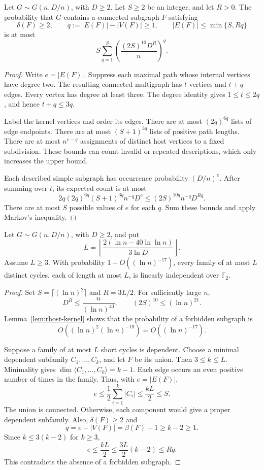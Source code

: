 \begin{lemma}
\label{lem:rhost-kernel}
Let $G\sim G(n,D/n)$, with $D\ge2$.
Let $S\ge2$ be an integer, and let $R>0$.
The probability that $G$ contains a connected subgraph $F$ satisfying
\[
 \delta(F)\ge2,\qquad
 q:=|E(F)|-|V(F)|\ge1,\qquad
 |E(F)|\le\min\{S,Rq\}
\]
is at most
\[
 S\sum_{q=1}^{S}
 \left(\frac{(2S)^{10}D^R}{n}\right)^q.
\]
\end{lemma}

\begin{proof}
Write $e=|E(F)|$.
Suppress each maximal path whose internal vertices have degree two.
The resulting connected multigraph has $t$ vertices and $t+q$ edges.
Every vertex has degree at least three.
The degree identity gives $1\le t\le2q$, and hence $t+q\le3q$.

Label the kernel vertices and order its edges.
There are at most $(2q)^{6q}$ lists of edge endpoints.
There are at most $(S+1)^{3q}$ lists of positive path lengths.
There are at most $n^{e-q}$ assignments of distinct host vertices to a fixed subdivision.
These bounds can count invalid or repeated descriptions, which only increases the upper bound.

Each described simple subgraph has occurrence probability $(D/n)^e$.
After summing over $t$, its expected count is at most
\[
 2q(2q)^{6q}(S+1)^{3q}n^{-q}D^e
 \le (2S)^{10q}n^{-q}D^{Rq}.
\]
There are at most $S$ possible values of $e$ for each $q$.
Sum these bounds and apply Markov's inequality.
\end{proof}

\begin{lemma}
\label{lem:rhost-independence}
Let $G\sim G(n,D/n)$, with $D\ge2$, and put
\[
 L=\left\lfloor
 \frac{2(\ln n-40\ln\ln n)}{3\ln D}
 \right\rfloor.
\]
Assume $L\ge3$.
With probability $1-O((\ln n)^{-17})$, every family of at most $L$ distinct cycles,
each of length at most $L$, is linearly independent over $\mathbb F_2$.
\end{lemma}

\begin{proof}
Set $S=\lceil(\ln n)^2\rceil$ and $R=3L/2$.
For sufficiently large $n$,
\[
 D^R\le\frac{n}{(\ln n)^{40}},\qquad
 (2S)^{10}\le(\ln n)^{21}.
\]
Lemma~\ref{lem:rhost-kernel} shows that the probability of a forbidden subgraph is
\[
 O\!\left((\ln n)^2(\ln n)^{-19}\right)
 =O((\ln n)^{-17}).
\]

Suppose a family of at most $L$ short cycles is dependent.
Choose a minimal dependent subfamily $C_1,\ldots,C_k$, and let $F$ be its union.
Then $3\le k\le L$.
Minimality gives $\dim\langle C_1,\ldots,C_k\rangle=k-1$.
Each edge occurs an even positive number of times in the family.
Thus, with $e=|E(F)|$,
\[
 e\le\frac12\sum_{i=1}^k|C_i|\le\frac{kL}{2}\le S.
\]
The union is connected.
Otherwise, each component would give a proper dependent subfamily.
Also, $\delta(F)\ge2$ and
\[
 q=e-|V(F)|=\beta(F)-1\ge k-2\ge1.
\]
Since $k\le3(k-2)$ for $k\ge3$,
\[
 e\le\frac{kL}{2}\le\frac{3L}{2}(k-2)\le Rq.
\]
This contradicts the absence of a forbidden subgraph.
\end{proof}

